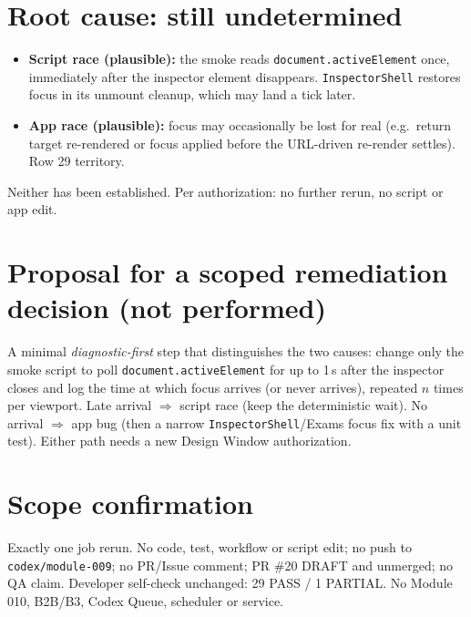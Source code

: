 \documentclass[11pt,a4paper]{article}
\begin{document}
\section{Root cause: still undetermined}
\begin{itemize}[nosep]
  \item \textbf{Script race (plausible):} the smoke reads \texttt{document.activeElement} once, immediately after the inspector element disappears. \texttt{InspectorShell} restores focus in its unmount cleanup, which may land a tick later.
  \item \textbf{App race (plausible):} focus may occasionally be lost for real (e.g.\ return target re-rendered or focus applied before the URL-driven re-render settles). Row 29 territory.
\end{itemize}
Neither has been established. Per authorization: no further rerun, no script or app edit.

\section{Proposal for a scoped remediation decision (not performed)}
A minimal \emph{diagnostic-first} step that distinguishes the two causes: change only the smoke script to poll \texttt{document.activeElement} for up to 1\,s after the inspector closes and log the time at which focus arrives (or never arrives), repeated $n$ times per viewport. Late arrival $\Rightarrow$ script race (keep the deterministic wait). No arrival $\Rightarrow$ app bug (then a narrow \texttt{InspectorShell}/Exams focus fix with a unit test). Either path needs a new Design Window authorization.

\section{Scope confirmation}
Exactly one job rerun. No code, test, workflow or script edit; no push to \texttt{codex/module-009}; no PR/Issue comment; PR \#20 DRAFT and unmerged; no QA claim. Developer self-check unchanged: 29 PASS / 1 PARTIAL. No Module 010, B2B/B3, Codex Queue, scheduler or service.
\end{document}
